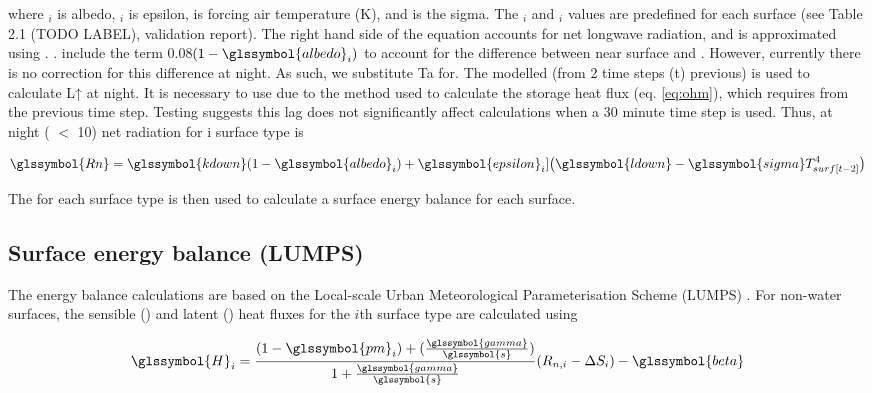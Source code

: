 \documentclass[final,3p,times,authoryear]{elsarticle}
\begin{document}
where $_{i}$ is \glsdesc{albedo}, $_{i}$ is \glsdesc{epsilon},  is forcing air temperature (K), and  is the \glsdesc{sigma}. The $_{i}$ and $_{i}$ values are predefined for each surface (see  Table 2.1 (TODO LABEL), validation report).  The right hand side of the equation accounts for net longwave radiation, and  is approximated using . \cite{Loridan2011}. include the term 0.08$(1-\glssymbol{albedo}_{i})$ to account for the difference between near surface  and . However, currently there is no correction for this difference at night. As such, we substitute Ta for. The modelled  (from 2 time steps (t) previous) is used to calculate L↑ at night. It is necessary to use  due to the method used to calculate the storage heat flux (eq. \ref{eq:ohm}), which requires  from the previous time step.  Testing suggests this lag does not significantly affect calculations when a 30 minute time step is used. Thus, at night ( $<$ 10) net radiation for i surface type is

\begin{equation} 
\glssymbol{Rn}  
 = \glssymbol{kdown} 
 (1-\glssymbol{albedo}_{i}) + \glssymbol{epsilon}_{i}] \big(\glssymbol{ldown}-\glssymbol{sigma} T_{surf[t-2]}^{4} \big) 
\label{eq:rn2} \end{equation} 


The  for each surface type is then used to calculate a surface energy balance for each surface. 
\subsection{Surface energy balance (LUMPS)}\label{sec:lumps}

The energy balance calculations are based on the Local-scale Urban Meteorological Parameterisation Scheme (LUMPS) \citep{Grimmond2002a}. For non-water surfaces, the sensible () and latent () heat fluxes for the $i$th surface type are calculated using


\begin{equation} 
\glssymbol{H}_{i} = 
\frac{(1-\glssymbol{pm}_{i})+(\frac{\glssymbol{gamma}}{\glssymbol{s}})}{1+\frac{\glssymbol{gamma}}{\glssymbol{s}}}
(R_{n,i} -\Delta S_{i})- \glssymbol{beta}
\label{eq:Hi} \end{equation} 
\end{document}
